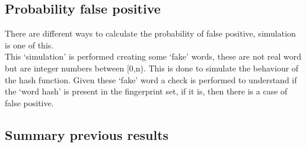 \documentclass[twocolumn,letterpaper]{report}
\begin{document}
{			\subsection{Probability false positive}
			There are different ways to calculate the probability of false positive, simulation is one of this. \\
			This `simulation' is performed creating some `fake' words, these are not real word but are integer numbers between [0,n). This is done to simulate the behaviour of the hash function. Given these `fake' word a check is performed to understand if the `word hash' is present in the fingerprint set, if it is, then there is a case of false positive.
			
			
			\subsection{Summary previous results}

				\begin{table}[h!]
				\renewcommand{\arraystretch}{1.35}
\end{table}}
\end{document}

